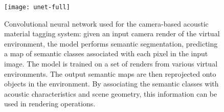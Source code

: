 \begin{landscape}
    \null\vfill
    \begin{figure}[htbp]
        \centering
        \texttt{[image: unet-full]}
        \caption[Camera-based acoustic material tagging model]{Convolutional neural network used for the camera-based acoustic material tagging system: given an input camera render of the virtual environment, the model performs semantic segmentation, predicting a map of semantic classes associated with each pixel in the input image. The model is trained on a set of renders from various virtual environments. The output semantic maps are then reprojected onto objects in the environment. By associating the semantic classes with acoustic characteristics and scene geometry, this information can be used in rendering operations.}\label{fig:cog-unet}
    \end{figure}
    \null\vfill
\end{landscape}